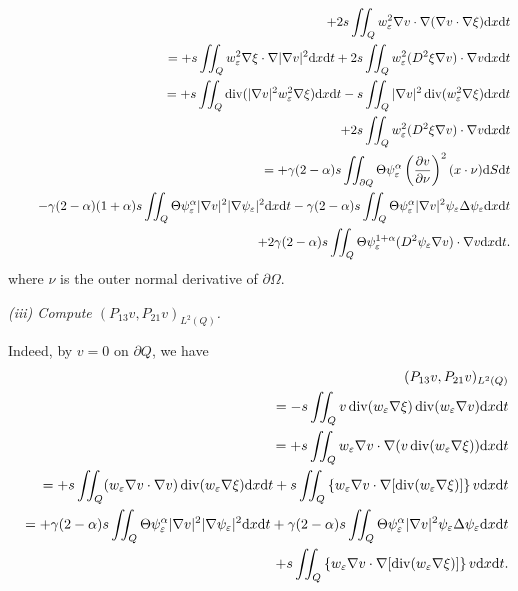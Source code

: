 \documentclass[11pt]{article}
\numberwithin{equation}{section}
\def\df{\mathrm d}
\DeclareMathOperator{\Div}{div}
\begin{document}
\begin{eqnarray*}
&&+2s\iint_Q w_\varepsilon^2\nabla v\cdot \nabla (\nabla v\cdot \nabla \xi)\df x\df t\\
&&= +s\iint_Q w_\varepsilon^2\nabla \xi \cdot \nabla |\nabla v|^2\df x\df t + 2s\iint_Q w_\varepsilon^2(D^2\xi \nabla v)\cdot \nabla v\df x\df t\\
&&= +s\iint_Q \Div(|\nabla v|^2w_\varepsilon^2\nabla \xi)\df x\df t - s\iint_Q |\nabla v|^2\Div(w_\varepsilon^2\nabla\xi)\df x\df t\\
&&\hspace{4.5mm}+2s\iint_Q w_\varepsilon^2(D^2\xi\nabla v)\cdot \nabla v\df x\df t\\
&&= +\gamma(2-\alpha)s\iint_{\partial Q}\Theta\psi_\varepsilon^\alpha \left(\frac{\partial v}{\partial \nu}\right)^2(x\cdot \nu)\df S\df t\\
&&\hspace{4.5mm}-\gamma(2-\alpha)(1+\alpha)s\iint_Q \Theta \psi_\varepsilon^\alpha |\nabla v|^2|\nabla\psi_\varepsilon|^2\df x\df t - \gamma(2-\alpha)s\iint_Q\Theta \psi_\varepsilon^\alpha|\nabla v|^2\psi_\varepsilon \Delta\psi_\varepsilon\df x\df t\\
&&\hspace{4.5mm}+2\gamma(2-\alpha)s\iint_Q\Theta \psi_\varepsilon^{1+\alpha}(D^2\psi_\varepsilon\nabla v)\cdot \nabla v\df x\df t.
\end{eqnarray*}
where $\nu$ is the outer normal derivative of $\partial\Omega$.

{\it (iii) Compute $(P_{13}v, P_{21}v)_{L^2(Q)}$.}

Indeed, by $v = 0$ on $\partial Q$, we have
\begin{eqnarray*}
&&(P_{13}v,P_{21}v)_{L^2(Q)}\\
&&= -s\iint_Q v\Div(w_\varepsilon\nabla\xi)\Div(w_\varepsilon \nabla v)\df x\df t\\
&&= +s\iint_Q w_\varepsilon \nabla v \cdot \nabla (v\Div(w_\varepsilon\nabla \xi))\df x\df t\\
&&= +s\iint_Q (w_\varepsilon \nabla v\cdot\nabla v)\Div(w_\varepsilon\nabla \xi)\df x\df t + s\iint_Q \left\{w_\varepsilon \nabla v\cdot \nabla [\Div(w_\varepsilon\nabla \xi)]\right\}v\df x\df t\\
&&= +\gamma(2-\alpha)s\iint_Q \Theta \psi_\varepsilon^\alpha |\nabla v|^2|\nabla\psi_\varepsilon|^2\df x\df t + \gamma(2-\alpha)s\iint_Q \Theta \psi_\varepsilon^\alpha |\nabla v|^2\psi_\varepsilon\Delta\psi_\varepsilon\df x\df t\\
&&\hspace{4.5mm}+s\iint_Q \left\{w_\varepsilon \nabla v\cdot \nabla [\Div(w_\varepsilon\nabla \xi)]\right\}v\df x\df t.
\end{eqnarray*}
\end{document}
